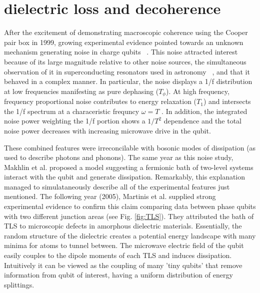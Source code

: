 \documentclass[%
 reprint,
showpacs,
 amsmath,amssymb,
 aps,
longbibliography,
]{revtex4-1}
\begin{document}
\section{dielectric loss and decoherence}
After the excitement of demonstrating macroscopic coherence using the Cooper pair box in 1999, growing experimental evidence pointed towards an unknown mechanism generating noise in charge qubits \ \cite{Astafiev_2004}. This noise attracted interest because of its large magnitude relative to other noise sources, the simultaneous observation of it in superconducting resonators used in astronomy \ \cite{zmuidzinas}, and  that it behaved in a complex manner. In particular, the noise displays a 1/f distribution at low frequencies manifesting as pure dephasing ($T_\phi$). At high frequency, frequency proportional noise contributes  to energy relaxation ($T_1$) and intersects the 1/f spectrum at a characeristic frequncy $\omega = T$ . In addition, the integrated noise power weighting the 1/f portion shows a $1/T^2$ dependence and the total noise power decreases with increasing microwave drive in the qubit. 

These combined features were irreconcilable with bosonic modes of dissipation (as used to describe photons and phonons). The same year as this noise study,  Makhlin et al. \cite{Mahklin_TLS} proposed a model suggesting a fermionic bath of two-level systems interact with the qubit and generate dissipation. Remarkably, this explanation managed to simulataneously describe all of the experimental features just mentioned. The following year (2005), Martinis et al. \cite{Martinis_2005} supplied strong experimental evidence to confirm this claim comparing data between phase qubits with two different junction areas (see Fig. \ref{fig:TLS}). They attributed the bath of TLS to microscopic defects in amorphous dielectric materials. Essentially, the random structure of the dielectric creates a potential energy landscape with many minima for atoms to tunnel between. The microwave electric field of the qubit easily couples to the dipole moments of each TLS and induces dissipation. Intuitively it can be viewed as the coupling of many 'tiny qubits' that remove information from qubit of interest, having a uniform distribution of energy splittings.
\end{document}
